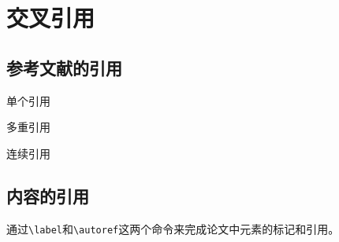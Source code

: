 \documentclass[supercite,fontset=windows]{../../upcthesis}
\begin{document}
\section{交叉引用}

\subsection{参考文献的引用}
单个引用

多重引用

连续引用





\subsection{内容的引用}

通过\verb|\label|和\verb|\autoref|这两个命令来完成论文中元素的标记和引用。
\end{document}
